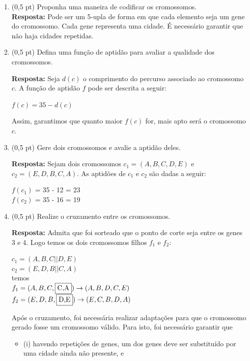 \documentclass[12pt,a4paper,oneside]{article}
\begin{document}
\begin{enumerate}
	\begin{enumerate}
		\item (0,5 pt) Proponha uma maneira de codificar os cromossomos.\\
		{\color{blue} {\bf Resposta:} Pode ser um 5-upla de forma em que cada elemento seja um gene do cromossomo. Cada gene representa uma cidade. É necessário garantir que não haja cidades repetidas.}
		\item (0,5 pt) Defina uma função de aptidão para avaliar a qualidade dos cromossomos.\\
		{\color{blue} {\bf Resposta:} Seja $d(c)$ o comprimento do percurso associado ao cromossomo $c$. A função de aptidão $f$ pode ser descrita a seguir:
			\begin{center}
				$f(c) = 35 - d(c)$
			\end{center}
		Assim, garantimos que quanto maior $f(c)$ for, mais apto será o cromossomo $c$.}
		\item (0,5 pt) Gere dois cromossomos e avalie a aptidão deles.\\
		{\color{blue} {\bf Resposta:} Sejam dois cromossomos $c_1 = (A,B,C,D,E)$ e $c_2 = (E,D,B,C,A)$. As aptidões de $c_1$ e $c_2$ são dadas a seguir:
			\begin{center}
				$f(c_1)$ 	= 35 - 12 = 23\\
				$f(c_2)$ 	= 35 - 16 = 19
			\end{center}}
		\item (0,5 pt) Realize o cruzamento entre os cromossomos.\\
		{\color{blue} {\bf Resposta:} Admita que foi sorteado que o ponto de corte seja entre os genes 3 e 4. Logo temos os dois cromossomos filhos $f_1$ e $f_2$:
			\begin{center}
				$c_1 = (A,B,C||D,E)$\\
				$c_2 = (E,D,B||C,A)$\\
				temos\\
				$f_1 = (A,B,C,\fbox{C,A}) \rightarrow (A,B,D,C,E)$\\
				$f_2 = (E,D,B,\fbox{D,E}) \rightarrow (E,C,B,D,A)$\\
			\end{center}
		Após o cruzamento, foi necessária realizar adaptações para que o cromossomo gerado fosse um cromossomo válido. Para isto, foi necessário garantir que 
		\begin{itemize}
			\item[] (i) havendo repetições de genes, um dos genes deve ser substituído por uma cidade ainda não presente, e

\end{itemize}}
\end{enumerate}
\end{enumerate}
\end{document}
